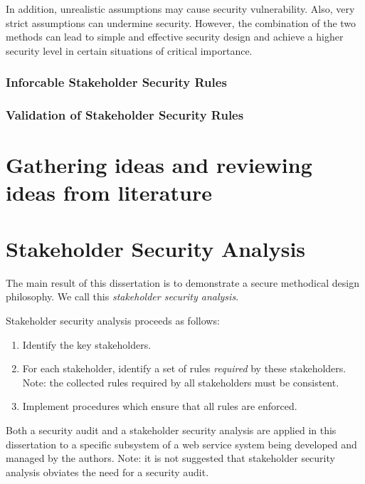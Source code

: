 In addition, unrealistic assumptions may cause security vulnerability. Also, very strict assumptions can undermine security. However, the combination of the two methods can lead to simple and effective security design and achieve a higher security level in certain situations of critical importance.
\subsubsection{Inforcable Stakeholder Security Rules}\label{Instsecrul}
\subsubsection{Validation of Stakeholder Security Rules}\label{vlstsecrul}

\section{Gathering ideas and reviewing ideas from literature}

\section{Stakeholder Security Analysis}


The main result of this dissertation is to demonstrate  a secure methodical design philosophy.
We call this {\em stakeholder security analysis}.

Stakeholder security analysis proceeds as follows: 
\begin{enumerate}[1.]
\item Identify the key stakeholders.
\item For each stakeholder, identify a set of rules {\em required}
by these stakeholders. Note: the collected rules required
by all stakeholders must be consistent.
\item Implement procedures which ensure that all rules are enforced.
\end{enumerate}

Both a security audit and a stakeholder security analysis
are applied in this dissertation to a specific subsystem of a web
service system being developed and managed by the authors.
Note: it is not suggested that stakeholder security analysis obviates
the need for a security audit.

\iffalse
\section{A social contract for cyberspace}
We proposed a social contract for cyberspace that can manage Stakeholders'
policies and ensure their respect by their owners.
\fi

